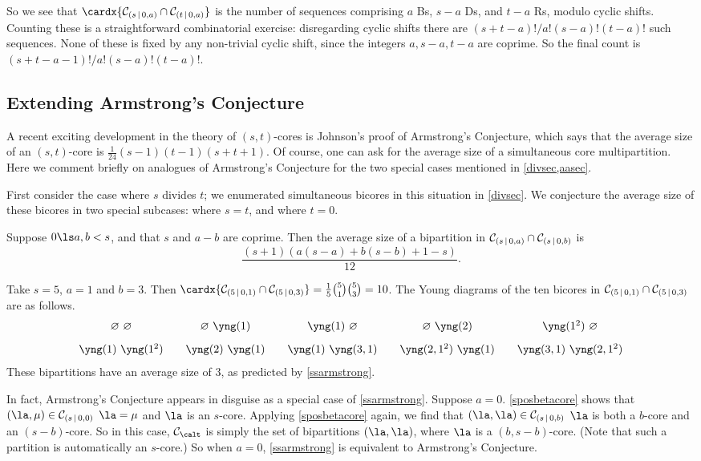 \documentclass[a4paper, 11pt, twoside]{article}
\begin{document}
So we see that $\cardx{\bc sa\cap\bc ta}$ is the number of sequences comprising $a$ Bs, $s-a$ Ds, and $t-a$ Rs, modulo cyclic shifts. Counting these is a straightforward combinatorial exercise: disregarding cyclic shifts there are $(s+t-a)!/a!(s-a)!(t-a)!$ such sequences. None of these is fixed by any non-trivial cyclic shift, since the integers $a,s-a,t-a$ are coprime. So the final count is $(s+t-a-1)!/a!(s-a)!(t-a)!$.

\subsection{Extending Armstrong's Conjecture}

A recent exciting development in the theory of $(s,t)$-cores is Johnson's proof \cite{j} of Armstrong's Conjecture, which says that the average size of an $(s,t)$-core is $\frac1{24}(s-1)(t-1)(s+t+1)$. Of course, one can ask for the average size of a simultaneous core multipartition. Here we comment briefly on analogues of Armstrong's Conjecture for the two special cases mentioned in \cref{divsec,aasec}.

First consider the case where $s$ divides $t$; we enumerated simultaneous bicores in this situation in \cref{divsec}. We conjecture the average size of these bicores in two special subcases: where $s=t$, and where $t=0$.

\begin{conj}\label{ssarmstrong}
Suppose $0\ls a,b<s$, and that $s$ and $a-b$ are coprime. Then the average size of a bipartition in $\mathcal{C}_{(s\,|\,0,a)}\cap\mathcal{C}_{(s\,|\,0,b)}$ is
\[
\frac{(s+1)(a(s-a)+b(s-b)+1-s)}{12}.
\]
\end{conj}

\begin{eg}
\Yboxdim{7pt}
Take $s=5$, $a=1$ and $b=3$. Then $\cardx{\bc51\cap\bc53}=\frac15\binom51\binom53=10$. The Young diagrams of the ten bicores in $\mathcal{C}_{(5\,|\,0,1)}\cap\mathcal{C}_{(5\,|\,0,3)}$ are as follows.
\[
\begin{array}{c@{\qquad}c@{\qquad}c@{\qquad}c@{\qquad}c}
\varnothing\ \varnothing&\varnothing\ \yng(1)&\yng(1)\ \varnothing&\varnothing\ \yng(2)&\yng(1^2)\ \varnothing
\\[9pt]
\yng(1)\ \yng(1^2)&\yng(2)\ \yng(1)&\yng(1)\ \yng(3,1)&\yng(2,1^2)\ \yng(1)&\yng(3,1)\ \yng(2,1^2)
\end{array}
\]
These bipartitions have an average size of $3$, as predicted by \cref{ssarmstrong}.
\end{eg}

\begin{rmk}
In fact, Armstrong's Conjecture appears in disguise as a special case of \cref{ssarmstrong}. Suppose $a=0$. \ref{sposbetacore} shows that $(\la,\mu)\in\mc s{0,0}$ \iff $\la=\mu$ and $\la$ is an $s$-core. Applying \ref{sposbetacore} again, we find that $(\la,\la)\in\mc s{0,b}$ \iff $\la$ is both a $b$-core and an $(s-b)$-core. So in this case, $\smc\calt$ is simply the set of bipartitions $(\la,\la)$, where $\la$ is a $(b,s-b)$-core. (Note that such a partition is automatically an $s$-core.) So when $a=0$, \cref{ssarmstrong} is equivalent to Armstrong's Conjecture.
\end{rmk}
\end{document}

